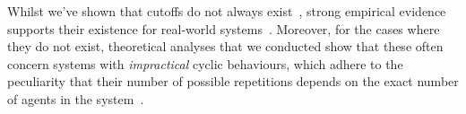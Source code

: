 \documentclass{article}
\begin{document}


Whilst we've shown that cutoffs do not always exist~\cite{KouvarosLomuscio13b},
strong empirical evidence supports their existence for real-world
systems~\cite{EmersonKahlon00,EmersonNamjoshi95,Benjamin+14}. Moreover, for the
cases where they do not exist, theoretical analyses that we conducted show that
these often concern systems with {\em impractical} cyclic behaviours, which
adhere to the peculiarity that their number of possible repetitions depends on
the exact number of agents in the system~\cite{KouvarosLomuscio13b}.

\end{document}
